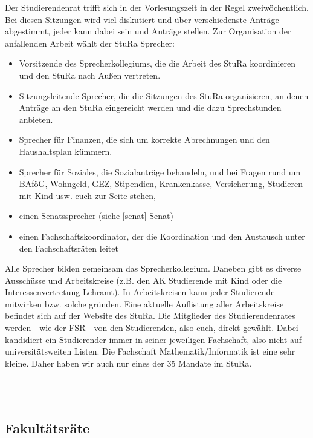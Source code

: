 Der Studierendenrat trifft sich in der Vorlesungszeit in der Regel zweiwöchentlich.
Bei diesen Sitzungen wird viel diskutiert und über verschiedenste Anträge abgestimmt, jeder kann dabei sein und Anträge stellen.
Zur Organisation der anfallenden Arbeit wählt der StuRa Sprecher:

\begin{itemize}
    \item Vorsitzende des Sprecherkollegiums, die die Arbeit des StuRa koordinieren und den StuRa nach Außen vertreten.
    \item Sitzungsleitende Sprecher, die die Sitzungen des StuRa organisieren, an denen Anträge an den StuRa eingereicht werden und die dazu Sprechstunden anbieten.
    \item Sprecher für Finanzen, die sich um korrekte Abrechnungen und den Haushaltsplan kümmern.
    \item Sprecher für Soziales, die Sozialanträge behandeln, und bei Fragen rund um BAföG, Wohngeld, GEZ, Stipendien, Krankenkasse, Versicherung, Studieren mit Kind usw. euch zur Seite stehen,
    \item einen Senatssprecher (siehe \ref{senat} Senat)
    \item einen Fachschaftskoordinator, der die Koordination und den Austausch unter den Fachschaftsräten leitet
\end{itemize}

Alle Sprecher bilden gemeinsam das Sprecherkollegium.
Daneben gibt es diverse Ausschüsse und Arbeitskreise (z.B. den AK Studierende mit Kind oder die Interessenvertretung Lehramt).
In Arbeitskreisen kann jeder Studierende mitwirken bzw. solche gründen.
Eine aktuelle Auflistung aller Arbeitskreise befindet sich auf der Website des StuRa.
Die Mitglieder des Studierendenrates werden - wie der FSR - von den Studierenden, also euch, direkt gewählt.
Dabei kandidiert ein Studierender immer in seiner jeweiligen Fachschaft, also nicht auf universitätsweiten Listen.
Die Fachschaft Mathematik/Informatik ist eine sehr kleine.
Daher haben wir auch nur eines der 35 Mandate im StuRa.


\\
\\

\subsection{Fakultätsräte}

